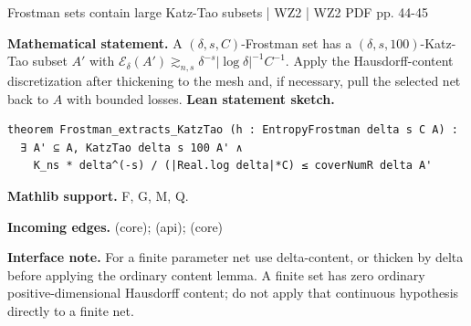 \documentclass[10pt,a4paper]{article}
\newcommand{\nodecard}[1]{\hyperlink{node-#1}{\texttt{\detokenize{#1}}}}
\begin{document}
\begin{minipage}{\linewidth}
\hypertarget{node-W2L7_6}{}
\begin{tcolorbox}[colback=white,colframe=cinematicfg,colbacktitle=cinematicbg,coltitle=ink,boxrule=0.45pt,arc=1.6mm,left=3mm,right=3mm,top=2mm,bottom=2mm,title={\sffamily\bfseries WZ2 Lemma 7.6 \hfill \texttt{W2L7\_6}}]
{\sffamily\small\color{muted}Frostman sets contain large Katz-Tao subsets | WZ2 | WZ2 PDF pp. 44-45}\par
\textbf{Mathematical statement.} A $(\delta,s,C)$-Frostman set has a $(\delta,s,100)$-Katz-Tao subset $A'$ with
$\mathcal E_\delta(A')\gtrsim_{n,s}\delta^{-s}|\log\delta|^{-1}C^{-1}$.
Apply the Hausdorff-content discretization after thickening to the mesh and, if necessary, pull the selected net back to $A$ with bounded losses.
\smallskip\textbf{Lean statement sketch.}
\begin{Verbatim}[fontsize=\small,breaklines=true,breakanywhere=true,tabsize=2]
theorem Frostman_extracts_KatzTao (h : EntropyFrostman delta s C A) :
  ∃ A' ⊆ A, KatzTao delta s 100 A' ∧
    K_ns * delta^(-s) / (|Real.log delta|*C) ≤ coverNumR delta A' 
\end{Verbatim}
{\footnotesize\textbf{Mathlib support.} F, G, M, Q.\par
\textbf{Incoming edges.} \nodecard{W2DFrost} (core); \nodecard{W2DKT} (api); \nodecard{XFO} (core)\par}
{\footnotesize\textbf{Interface note.} For a finite parameter net use delta-content, or thicken by delta before applying the ordinary content lemma. A finite set has zero ordinary positive-dimensional Hausdorff content; do not apply that continuous hypothesis directly to a finite net.}
\end{tcolorbox}\end{minipage}\par\medskip
\end{document}
